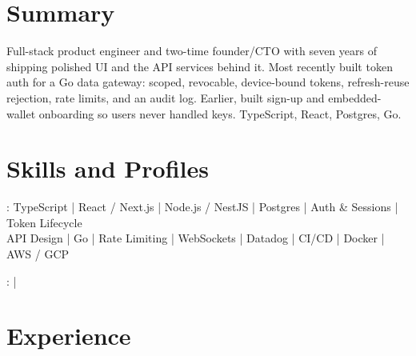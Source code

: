 \documentclass[print]{jack-resume}
\begin{document}
\pagecolor{darkmodeBackground}


\begin{minipage}[t][1cm][t]{.03\textwidth}
    \hfill
\end{minipage}

\section{Summary}
Full-stack product engineer and two-time founder/CTO with seven years of shipping polished UI and the API services behind it. Most recently built token auth for a Go data gateway: scoped, revocable, device-bound tokens, refresh-reuse rejection, rate limits, and an audit log. Earlier, built sign-up and embedded-wallet onboarding so users never handled keys. TypeScript, React, Postgres, Go.
\sectionsep

\section{Skills and Profiles}
:
TypeScript \hfill | \hfill
React / Next.js \hfill | \hfill
Node.js / NestJS \hfill | \hfill
Postgres \hfill | \hfill
Auth \& Sessions \hfill | \hfill
Token Lifecycle \\
\hspace{1.0cm} API Design \hfill | \hfill
Go \hfill | \hfill
Rate Limiting \hfill | \hfill
WebSockets \hfill | \hfill
Datadog \hfill | \hfill
CI/CD \hfill | \hfill
Docker \hfill | \hfill
AWS / GCP \\

\raggedright{
    :
      \href{https://www.linkedin.com/in/jack-sturtevant/}{ \ExternalLink} |
     \href{https://github.com/jacksturt}{ \ExternalLink}}

\section{Experience}
\end{document}
